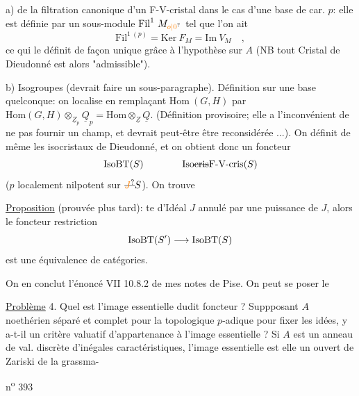 a)  de la filtration canonique d'un F-V-cristal dans
le cas d'une base  \handwritten{(}de car. $p$\handwritten{)}: elle est définie par un sous-module
$\mathrm{Fil}^{1}\ M_{\unsure{o|0}}$  tel que l'on ait
\[
\mathrm{Fil}^{1\ (p)}=\mathrm{Ker}\ F_M=\mathrm{Im}\ V_M\quad ,
\]
ce qui le définit de façon unique grâce à l'hypothèse sur $A$ (NB tout
Cristal de Dieudonné est alors "admissible").

b) Isogroupes  (devrait faire un sous-paragraphe). Définition
sur une base quelconque: on localise  en remplaçant
$\mathrm{Hom}\ (G,H)$ par $\mathrm{Hom}(G,H)\otimes_{\underline Z_p}\underline Q_p=\mathrm{Hom}\otimes_{\underline Z}\underline Q$. (Définition provisoire; elle
 a l'inconvénient de ne pas fournir un champ, et devrait
peut-être être reconsidérée ...). On définit de même les isocristaux
de Dieudonné, et on obtient donc un foncteur
\[
\mathrm{IsoBT}(S)\qquad\qquad\mathrm{Iso}\deleted{\mathrm{cris}}\text{F-V-cris}(S)
\]
($p$ localement nilpotent sur $\deleted{\unsure{J}}S$). On trouve

\uline{Proposition} (prouvée plus tard):  te d'Idéal $J$ annulé par une puissance de
$J$, alors le foncteur restriction
\[
\mathrm{IsoBT}(S')\longrightarrow\mathrm{IsoBT}(S)
\]
est une équivalence de catégories.

On en conclut l'énoncé VII 10.8.2 de mes notes de Pise.
On peut se poser le 

\uline{Problème} 4. Quel est l'image essentielle dudit foncteur ? Suppposant
$A$ noethérien séparé et complet pour la topologique $p$-adique pour fixer
les idées, y a-t-il un critère valuatif d'appartenance à l'image essentielle ? Si $A$ est un anneau de val. discrète \deleted{\unsure{(}}d'inégales caractéristiques, l'image essentielle est elle un ouvert de Zariski de la grassma-

n\textsuperscript{o} 393

